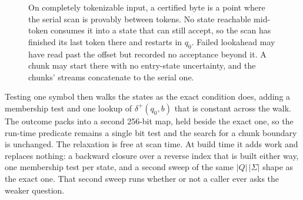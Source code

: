 \documentclass[11pt,a4paper]{article}
\theoremstyle{definition}
\theoremstyle{plain}
\begin{document}
\begin{figure}[!ht]
\centering
{}
\caption{On completely tokenizable input, a certified byte is a point where the serial scan is provably between
tokens. No state reachable mid-token consumes it into a state that can still accept, so the scan has finished its last
token there and restarts in $q_0$. Failed lookahead may have read past the offset but recorded no acceptance beyond
it. A chunk may start there with no entry-state uncertainty, and the chunks' streams concatenate to the serial one.}
\label{fig:split}
\end{figure}

Testing one symbol then walks the states as the exact condition does, adding a membership test and one lookup of
$\delta^+(q_0, b)$ that is constant across the walk. The outcome packs into a second 256-bit map, held beside the exact
one, so the run-time predicate remains a single bit test and the search for a chunk boundary is unchanged. The
relaxation is free at scan time. At build time it adds work and replaces nothing: a backward closure over a reverse
index that is built either way, one membership test per state, and a second sweep of the same $|Q|\,|\Sigma|$ shape as
the exact one. That second sweep runs whether or not a caller ever asks the weaker question.
\end{document}

